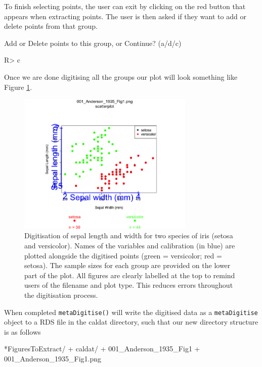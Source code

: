 \documentclass[12pt]{article}
\newcommand{\code}[1]{\texttt{#1}}
\newcommand{\fct}[1]{\texttt{#1()}}
\begin{document}
To finish selecting points, the user can exit by clicking on the red button that appears when extracting points. The user is then asked if they want to add or delete points from that group. 

\begin{CodeChunk}
\begin{CodeOutput}
Add or Delete points to this group, or Continue? (a/d/c) 
\end{CodeOutput}
\begin{CodeInput}
R> c
\end{CodeInput}
\end{CodeChunk}

Once we are done digitising all the groups our plot will look something like Figure \ref{fig:scatter_extract}.

\begin{figure}[!h] 
\centering
 \includegraphics[width=0.75\textwidth]{001_Anderson_1935_Fig1_digitised.png} 
 \caption{Digitisation of sepal length and width for two species of iris (setosa and versicolor). Names of the variables and calibration (in blue) are plotted alongside the digitised points (green = versicolor; red = setosa). The sample sizes for each group are provided on the lower part of the plot. All figures are clearly labelled at the top to remind users of the filename and plot type. This reduces errors throughout the digitisation process.}
\label{fig:scatter_extract}
\end{figure}

When completed \fct{metaDigitise} will write the digitised data as a \code{metaDigitise} object to a RDS file in the caldat directory, such that our new directory structure is as follows

\begin{CodeChunk}
\begin{CodeOutput}
*FiguresToExtract/
    + caldat/
        + 001_Anderson_1935_Fig1
    + 001_Anderson_1935_Fig1.png
\end{CodeOutput}
\end{CodeChunk}
\end{document}
